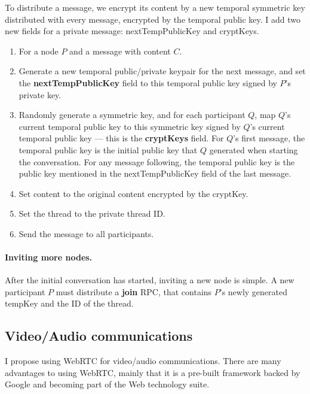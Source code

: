 \documentclass[10pt,a4paper,onecolumn]{article}
\begin{document}
To distribute a message, we encrypt its content by a new temporal symmetric key distributed with every message, encrypted by the temporal public key. I add two new fields for a private message: nextTempPublicKey and cryptKeys.
\begin{enumerate}
\item For a node $P$ and a message with content $C$.
\item Generate a new temporal public/private keypair for the next message, and set the \textbf{nextTempPublicKey} field to this temporal public key signed by $P$'s private key.
\item Randomly generate a symmetric key, and for each participant $Q$, map $Q$'s current temporal public key to this symmetric key signed by $Q$'s current temporal public key ­— this is the \textbf{cryptKeys} field. For $Q$'s first message, the temporal public key is the initial public key that $Q$ generated when starting the conversation. For any message following, the temporal public key is the public key mentioned in the nextTempPublicKey field of the last message. 
\item Set content to the original content encrypted by the cryptKey.
\item Set the thread to the private thread ID. 
\item Send the message to all participants.
\end{enumerate}

\paragraph*{Inviting more nodes.}
After the initial conversation has started, inviting a new node is simple. A new participant $P$ must distribute a \textbf{join} RPC, that contains $P$'s newly generated tempKey and the ID of the thread. 

\subsection*{Video/Audio communications}
I propose using WebRTC for video/audio communications. There are many advantages to using WebRTC, mainly that it is a pre-built framework backed by Google and becoming part of the Web technology suite. 


\end{document}
